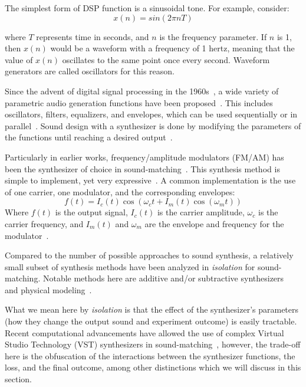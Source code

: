 \documentclass[lettersize,journal]{IEEEtran}
\newcommand{\highlight}[1]{\textcolor[RGB]{00,100,100}{#1}}
\providecommand{\gls}[1]{#1}
\begin{document}
The simplest form of DSP function is a sinusoidal tone. For example, consider:
\[ x(n) = sin( 2\pi n T)\]

where $T$ represents time in seconds, and $n$ is the frequency parameter. If $n$ is 1, then $x(n)$ would be a waveform with a frequency of 1 hertz, meaning that the value of $x(n)$ oscillates to the same point once every second. Waveform generators are called oscillators for this reason. 

Since the advent of digital signal processing in the 1960s~\cite{stranneby2004digital}, a wide variety of parametric audio generation functions have been proposed~\cite{lyons1997understanding,russ1999sound,shier2020spiegelib}. This includes oscillators, filters, equalizers, and envelopes, which can be used sequentially or in parallel~\cite{lyons1997understanding,russ1999sound}. Sound design with a synthesizer is done by modifying the parameters of the functions until reaching a desired output~\cite{roads1996computer,pinch2004analog}.

Particularly in earlier works, frequency/amplitude modulators (\gls{FM}/\gls{AM}) has been the synthesizer of choice in sound-matching~\cite{horner1993machine,mitchell2007evolutionary,vahidi2023mesostructures}. This synthesis method is simple to implement, yet very expressive~\cite{chowning1973synthesis}. A common implementation is the use of one carrier, one modulator, and the corresponding envelopes:
\[ f(t) = I_c(t) \cos(\omega_c t + I_m(t) \cos(\omega_m t))
\]
Where $f(t)$ is the output signal, $I_c(t)$ is the carrier amplitude, $\omega_c$ is the carrier frequency, and $I_m(t)$ and $\omega_m$ are the envelope and frequency for the modulator~\cite{justice1979analytic}. 

Compared to the number of possible approaches to sound synthesis, a relatively small subset of synthesis methods have been analyzed in \textit{isolation} for sound-matching. Notable methods here are additive and/or subtractive synthesizers~\cite{engel2020ddsp,masuda2023improving,salimi2020make} and physical modeling~\cite{riionheimo2003parameter,han2024learning}.

\highlight{
What we mean here by \textit{isolation} is that the effect of the synthesizer's parameters (how they change the output sound and experiment outcome) is easily tractable. Recent computational advancements have allowed the use of complex Virtual Studio Technology (VST)\cite{steinberg1996vst} synthesizers in sound-matching~\cite{yee2018automatic,esling2019flow}, however, the trade-off here is the obfuscation of the interactions between the synthesizer functions, the loss, and the final outcome, among other distinctions which we will discuss in this section. 
}
\end{document}
